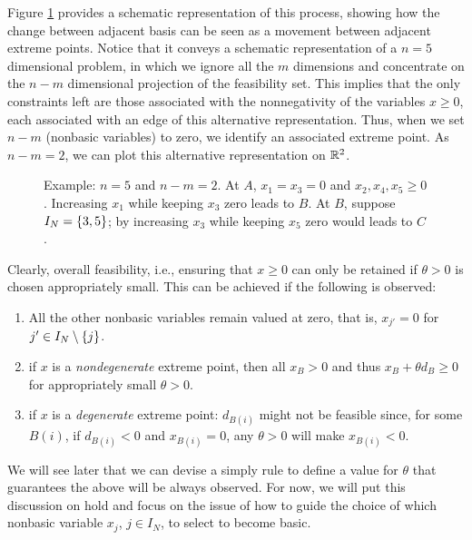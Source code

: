 
Figure \ref{p1c3:fig:adjacent_vertices} provides a schematic representation of this process, showing how the change between adjacent basis can be seen as a movement between adjacent extreme points. Notice that it conveys a schematic representation of a $n=5$ dimensional problem, in which we ignore all the $m$ dimensions and concentrate on the $n-m$ dimensional projection of the feasibility set. This implies that the only constraints left are those associated with the nonnegativity of the variables $x \ge 0$, each associated with an edge of this alternative representation. Thus, when we set $n-m$ (nonbasic variables) to zero, we identify an associated extreme point. As $n-m = 2$, we can plot this alternative representation on $\mathbb{R}^2$.

\begin{figure}[h]
	\caption{Example: $n = 5$ and $n-m = 2$. At $A$, $x_1 = x_3 = 0$ and $x_2, x_4, x_5 \geq 0$. Increasing $x_1$ while keeping $x_3$ zero leads to $B$. At $B$, suppose $I_N = \left\{ 3,5 \right \}$; by increasing $x_3$ while keeping $x_5$ zero would leads to $C$.} \label{p1c3:fig:adjacent_vertices}
\end{figure}

Clearly, overall feasibility, i.e., ensuring that $x \ge 0$ can only be retained if $\theta > 0$ is chosen appropriately small. This can be achieved if the following is observed:
%
\begin{enumerate}
	\item All the other nonbasic variables remain valued at zero, that is, $x_{j'} = 0$ for $j' \in I_N \setminus \left\{ j \right \}$.	
	\item if $x$ is a \emph{nondegenerate} extreme point, then all $x_B > 0$ and thus $x_B + \theta d_B \geq 0$ for appropriately small $\theta > 0$. 
	\item if $x$ is a \emph{degenerate} extreme point: $d_{B(i)}$ might not be feasible since, for some $B(i)$, if $d_{B(i)} < 0$ and $x_{B(i)} = 0$, any $\theta > 0$ will make $x_{B(i)} < 0$.
\end{enumerate}
%
We will see later that we can devise a simply rule to define a value for $\theta$ that guarantees the above will be always observed. For now, we will put this discussion on hold and focus on the issue of how to guide the choice of which nonbasic variable $x_j$, $j \in I_N$, to select to become basic.


